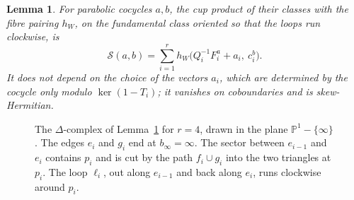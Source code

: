 \documentclass[11pt]{amsart}
\newtheorem{lemma}[theorem]{Lemma}
\theoremstyle{definition}
\theoremstyle{remark}
\newcommand{\PP}{\mathbb P}
\begin{document}
\begin{lemma}\label{lem:cocycle}
For parabolic cocycles $a,b$, the cup product of their classes with the fibre pairing $h_W$, on the fundamental class oriented so that the loops run clockwise, is
\[
\mathcal S(a,b)=\sum_{i=1}^rh_W\big(Q_i^{-1}F^a_i+a_i,\ c^b_i\big).
\]
It does not depend on the choice of the vectors $a_i$, which are determined by the cocycle only modulo $\ker(1-T_i)$; it vanishes on coboundaries and is skew-Hermitian.
\end{lemma}

\begin{figure}[ht]
\centering
{}
\caption{The $\Delta$-complex of Lemma~\ref{lem:cocycle} for $r=4$, drawn in the plane $\PP^1-\{\infty\}$. The edges $e_i$ and $g_i$ end at $b_\infty=\infty$. The sector between $e_{i-1}$ and $e_i$ contains $p_i$ and is cut by the path $f_i\cup g_i$ into the two triangles at $p_i$. The loop $\ell_i$, out along $e_{i-1}$ and back along $e_i$, runs clockwise around $p_i$.}\label{fig:delta}
\end{figure}
\end{document}
